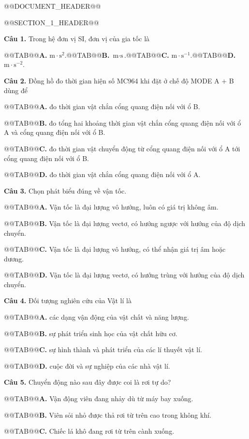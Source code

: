 \documentclass{article}
\begin{document}
@@DOCUMENT_HEADER@@

@@SECTION_1_HEADER@@

\textbf{Câu 1.} Trong hệ đơn vị SI, đơn vị của gia tốc là

@@TAB@@\textbf{A.} $\text{m}\cdot\text{s}^2$.@@TAB@@\textbf{B.} $\text{m}\cdot\text{s}$.@@TAB@@\textbf{C.} $\text{m}\cdot\text{s}^{-1}$.@@TAB@@\textbf{D.} $\text{m}\cdot\text{s}^{-2}$.

\textbf{Câu 2.} Đồng hồ đo thời gian hiện số MC964 khi đặt ở chế độ MODE A $+$ B dùng để

@@TAB@@\textbf{A.} đo thời gian vật chắn cổng quang điện nối với ổ B.

@@TAB@@\textbf{B.} đo tổng hai khoảng thời gian vật chắn cổng quang điện nối với ổ A và cổng quang điện nối với ổ B.

@@TAB@@\textbf{C.} đo thời gian vật chuyển động từ cổng quang điện nối với ổ A tới cổng quang điện nối với ổ B.

@@TAB@@\textbf{D.} đo thời gian vật chắn cổng quang điện nối với ổ A.

\textbf{Câu 3.} Chọn phát biểu đúng về vận tốc.

@@TAB@@\textbf{A.} Vận tốc là đại lượng vô hướng, luôn có giá trị không âm.

@@TAB@@\textbf{B.} Vận tốc là đại lượng vectơ, có hướng ngược với hướng của độ dịch chuyển.

@@TAB@@\textbf{C.} Vận tốc là đại lượng vô hướng, có thể nhận giá trị âm hoặc dương.

@@TAB@@\textbf{D.} Vận tốc là đại lượng vectơ, có hướng trùng với hướng của độ dịch chuyển.

\textbf{Câu 4.} Đối tượng nghiên cứu của Vật lí là

@@TAB@@\textbf{A.} các dạng vận động của vật chất và năng lượng.

@@TAB@@\textbf{B.} sự phát triển sinh học của vật chất hữu cơ.

@@TAB@@\textbf{C.} sự hình thành và phát triển của các lí thuyết vật lí.

@@TAB@@\textbf{D.} cuộc đời và sự nghiệp của các nhà vật lí.

\textbf{Câu 5.} Chuyển động nào sau đây được coi là rơi tự do?

@@TAB@@\textbf{A.} Vận động viên đang nhảy dù từ máy bay xuống.

@@TAB@@\textbf{B.} Viên sỏi nhỏ được thả rơi từ trên cao trong không khí.

@@TAB@@\textbf{C.} Chiếc lá khô đang rơi từ trên cành xuống.
\end{document}
